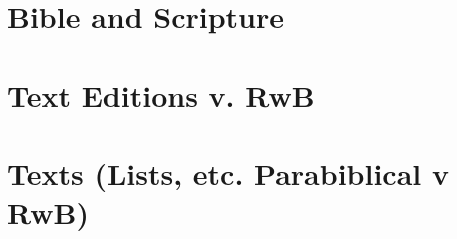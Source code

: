 \section{Bible and Scripture}\label{bible-and-scripture}

\section{Text Editions v. RwB}\label{text-editions-v.-rwb}

\section*{Texts (Lists, etc. Parabiblical v
RwB)}\label{texts-lists-etc.-parabiblical-v-rwb}
